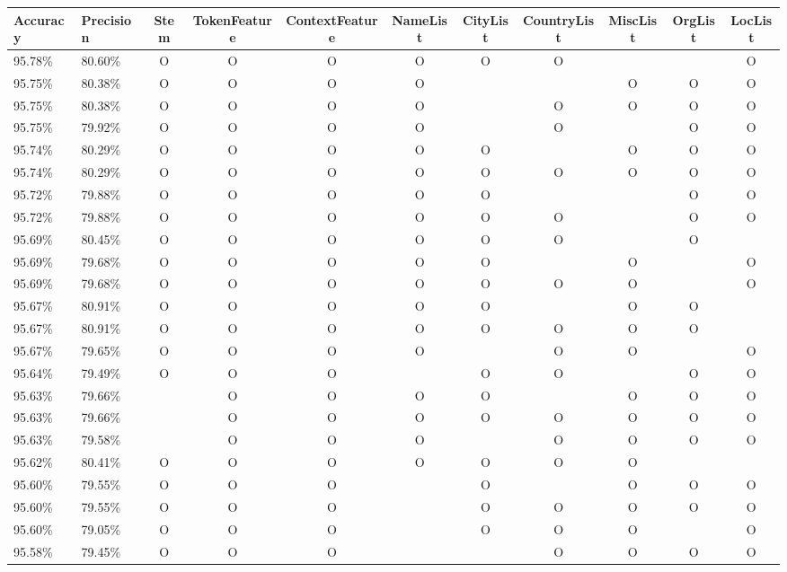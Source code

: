 \documentclass[11pt, english]{article}
\begin{document}
\begin{landscape}
  \centering
  \tiny
  \begin{tabular}{ll|ccccccccc}
    Accuracy & Precision & Stem & TokenFeature & ContextFeature & NameList & CityList & CountryList & MiscList & OrgList & LocList\\
    \hline
    95.78\% & 80.60\% & O & O & O & O & O & O &  &  & O\label{tbl:rw:best}\\
    95.75\% & 80.38\% & O & O & O & O &  &  & O & O & O\\
    95.75\% & 80.38\% & O & O & O & O &  & O & O & O & O\\
    95.75\% & 79.92\% & O & O & O & O &  & O &  & O & O\\
    95.74\% & 80.29\% & O & O & O & O & O &  & O & O & O\\
    95.74\% & 80.29\% & O & O & O & O & O & O & O & O & O\label{tbl:rw:all}\\
    95.72\% & 79.88\% & O & O & O & O & O &  &  & O & O\\
    95.72\% & 79.88\% & O & O & O & O & O & O &  & O & O\\
    95.69\% & 80.45\% & O & O & O & O & O & O &  & O & \\
    95.69\% & 79.68\% & O & O & O & O & O &  & O &  & O\\
    95.69\% & 79.68\% & O & O & O & O & O & O & O &  & O\\
    95.67\% & 80.91\% & O & O & O & O & O &  & O & O & \\
    95.67\% & 80.91\% & O & O & O & O & O & O & O & O & \\
    95.67\% & 79.65\% & O & O & O & O &  & O & O &  & O\\
    95.64\% & 79.49\% & O & O & O &  & O & O &  & O & O\\
    95.63\% & 79.66\% &  & O & O & O & O &  & O & O & O\\
    95.63\% & 79.66\% &  & O & O & O & O & O & O & O & O\\
    95.63\% & 79.58\% &  & O & O & O &  & O & O & O & O\\
    95.62\% & 80.41\% & O & O & O & O & O & O & O &  & \\
    95.60\% & 79.55\% & O & O & O &  & O &  & O & O & O\\
    95.60\% & 79.55\% & O & O & O &  & O & O & O & O & O\\
    95.60\% & 79.05\% & O & O & O &  & O & O & O &  & O\\
    95.58\% & 79.45\% & O & O & O &  &  & O & O & O & O\\

\end{tabular}
\end{landscape}
\end{document}
